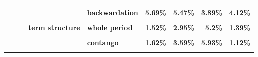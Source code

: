 \documentclass[
  authoryear,
  preprint,
  3p]{elsarticle}
\begin{document}
\begin{landscape}
\begin{longtable}[t]{>{}l>{}l>{}l>{}l>{}l>{}r>{}r>{}r>{}r}
\textbf{\cellcolor{gray!10}{}} & \textbf{\cellcolor{gray!10}{}} & \textbf{\cellcolor{gray!10}{}} & \textbf{\cellcolor{gray!10}{open interest}} & \textbf{\cellcolor{gray!10}{whole period}} & \textcolor[HTML]{4285f4}{\textbf{\cellcolor{gray!10}{5.98\%}}} & \textcolor[HTML]{4285f4}{\textbf{\cellcolor{gray!10}{5.63\%}}} & \textcolor[HTML]{4285f4}{\textbf{\cellcolor{gray!10}{4.09\%}}} & \textcolor[HTML]{4285f4}{\textbf{\cellcolor{gray!10}{4.32\%}}}\\
\textbf{} & \textbf{} & \textbf{} & \textbf{} & \textbf{backwardation} & \textcolor[HTML]{4285f4}{\textbf{5.69\%}} & \textcolor[HTML]{4285f4}{\textbf{5.47\%}} & \textcolor[HTML]{4285f4}{\textbf{3.89\%}} & \textcolor[HTML]{4285f4}{\textbf{4.12\%}}\\
\textbf{\cellcolor{gray!10}{}} & \textbf{\cellcolor{gray!10}{}} & \textbf{\cellcolor{gray!10}{}} & \textbf{\cellcolor{gray!10}{}} & \textbf{\cellcolor{gray!10}{contango}} & \textcolor[HTML]{4285f4}{\textbf{\cellcolor{gray!10}{6.41\%}}} & \textcolor[HTML]{4285f4}{\textbf{\cellcolor{gray!10}{6.21\%}}} & \textcolor[HTML]{4285f4}{\textbf{\cellcolor{gray!10}{4.73\%}}} & \textcolor[HTML]{4285f4}{\textbf{\cellcolor{gray!10}{4.74\%}}}\\
\textbf{} & \textbf{} & \textbf{} & \textbf{term structure} & \textbf{whole period} & \textcolor[HTML]{4285f4}{\textbf{1.52\%}} & \textcolor[HTML]{4285f4}{\textbf{2.95\%}} & \textcolor[HTML]{4285f4}{\textbf{5.2\%}} & \textcolor[HTML]{4285f4}{\textbf{1.39\%}}\\
\addlinespace
\textbf{\cellcolor{gray!10}{}} & \textbf{\cellcolor{gray!10}{}} & \textbf{\cellcolor{gray!10}{}} & \textbf{\cellcolor{gray!10}{}} & \textbf{\cellcolor{gray!10}{backwardation}} & \textcolor[HTML]{4285f4}{\textbf{\cellcolor{gray!10}{1.87\%}}} & \textcolor[HTML]{4285f4}{\textbf{\cellcolor{gray!10}{2.7\%}}} & \textcolor[HTML]{4285f4}{\textbf{\cellcolor{gray!10}{4.56\%}}} & \textcolor[HTML]{4285f4}{\textbf{\cellcolor{gray!10}{2.3\%}}}\\
\textbf{} & \textbf{} & \textbf{} & \textbf{} & \textbf{contango} & \textcolor[HTML]{4285f4}{\textbf{1.62\%}} & \textcolor[HTML]{4285f4}{\textbf{3.59\%}} & \textcolor[HTML]{4285f4}{\textbf{5.93\%}} & \textcolor[HTML]{4285f4}{\textbf{1.12\%}}\\
\textbf{\cellcolor{gray!10}{US}} & \textbf{\cellcolor{gray!10}{all}} & \textbf{\cellcolor{gray!10}{all}} & \textbf{\cellcolor{gray!10}{market}} & \textbf{\cellcolor{gray!10}{whole period}} & \textcolor[HTML]{4285f4}{\textbf{\cellcolor{gray!10}{11.67\%}}} & \textcolor[HTML]{4285f4}{\textbf{\cellcolor{gray!10}{21.7\%}}} & \textcolor[HTML]{4285f4}{\textbf{\cellcolor{gray!10}{30.69\%}}} & \textcolor[HTML]{4285f4}{\textbf{\cellcolor{gray!10}{15.73\%}}}\\

\end{longtable}
\end{landscape}
\end{document}
